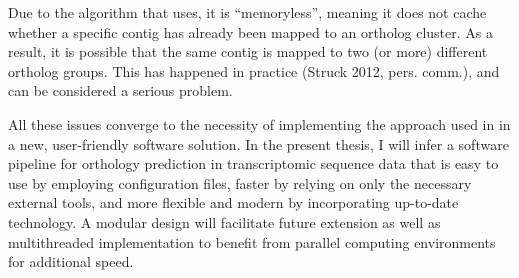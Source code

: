 Due to the algorithm that \hamstr uses, it is ``memoryless'', meaning it does
not cache whether a specific contig has already been mapped to an ortholog
cluster. As a result, it is possible that the same contig is mapped to two (or
more) different ortholog groups. This has happened in practice (Struck 2012,
pers. comm.), and can be considered a serious problem.

All these issues converge to the necessity of implementing the approach used in
\hamstr in a new, user-friendly software solution. In the present thesis, I will
infer a software pipeline for orthology prediction in transcriptomic sequence
data that is easy to use by employing configuration files, faster by relying on
only the necessary external tools, and more flexible and modern by incorporating
up-to-date technology. A modular design will facilitate future extension as well
as multithreaded implementation to benefit from parallel computing environments
for additional speed.
